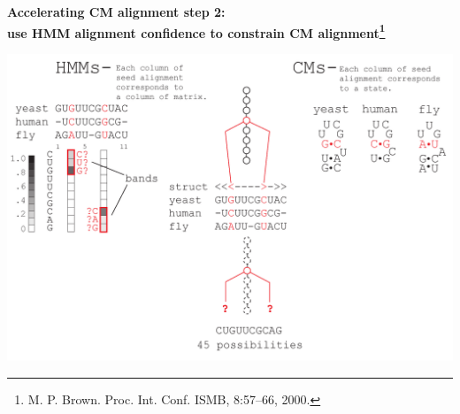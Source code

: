 \documentclass[landscape]{slides}
\begin{document}
\begin{slide}
\begin{center}

\textbf{Accelerating CM alignment step 2: \\ use HMM alignment
  confidence to constrain CM alignment\footnote{M. P. Brown. Proc. Int. Conf. ISMB, 8:57–66, 2000.}}
\end{center}
\medskip
\small
\begin{center}
\includegraphics[width=8in]{figs/post_hmm_to_cm_map2_layer15}
\end{center}
\vfill
\end{slide}
\end{document}
